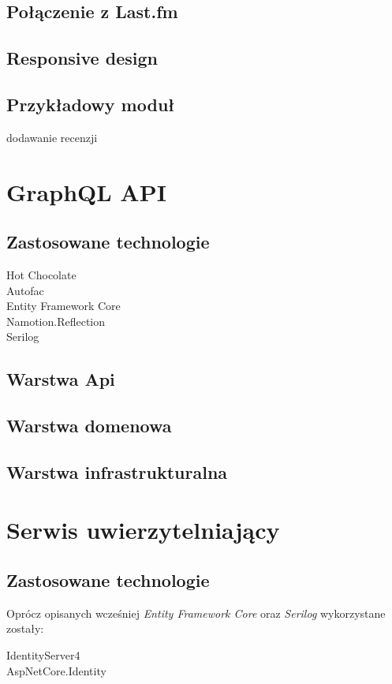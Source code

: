 	\subsection{Połączenie z Last.fm}

	\subsection{Responsive design}

	\subsection{Przykładowy moduł}
		dodawanie recenzji

\section{GraphQL API}
	\subsection{Zastosowane technologie}
		\begin{description}
			\item[Hot Chocolate] 
			\item[Autofac] 
			\item[Entity Framework Core] 
			\item[Namotion.Reflection] 
			\item[Serilog] 
		\end{description}

	\subsection{Warstwa Api}

	\subsection{Warstwa domenowa}

	\subsection{Warstwa infrastrukturalna}
	
\section{Serwis uwierzytelniający}
	\subsection{Zastosowane technologie}
		Oprócz opisanych wcześniej \emph{Entity Framework Core} oraz \emph{Serilog} wykorzystane zostały:
		\begin{description}
			\item[IdentityServer4] 
			\item[AspNetCore.Identity] 
		\end{description}

